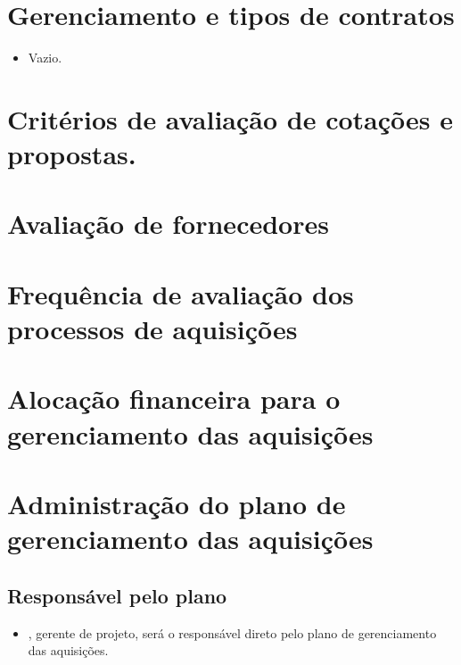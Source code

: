 \section{Gerenciamento e tipos de contratos}

\begin{itemize}
\item Vazio.
\end{itemize}


\section{Critérios de avaliação de cotações e propostas.}


\section{Avaliação de fornecedores}


\section{Frequência de avaliação dos processos de aquisições}


\section{Alocação financeira para o gerenciamento das aquisições}


\section{Administração do plano de gerenciamento das aquisições}

\subsection{Responsável pelo plano}

\begin{itemize}
	\item \projectManagerName{}, gerente de projeto, será o responsável direto pelo plano de gerenciamento das aquisições.
\end{itemize}

